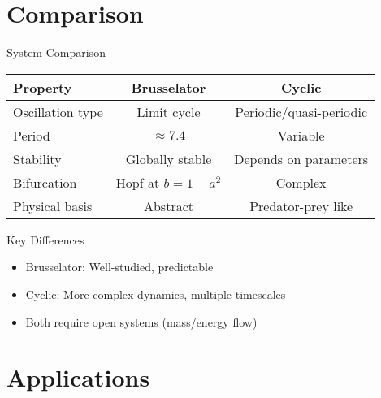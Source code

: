 \documentclass{beamer}
\begin{document}
\section{Comparison}

\begin{frame}{System Comparison}
\begin{table}
\centering
\begin{tabular}{|l|c|c|}
\hline
\textbf{Property} & \textbf{Brusselator} & \textbf{Cyclic} \\
\hline
Oscillation type & Limit cycle & Periodic/quasi-periodic \\
Period & $\approx 7.4$ & Variable \\
Stability & Globally stable & Depends on parameters \\
Bifurcation & Hopf at $b = 1 + a^2$ & Complex \\
Physical basis & Abstract & Predator-prey like \\
\hline
\end{tabular}
\end{table}

\begin{block}{Key Differences}
\begin{itemize}
    \item Brusselator: Well-studied, predictable
    \item Cyclic: More complex dynamics, multiple timescales
    \item Both require open systems (mass/energy flow)
\end{itemize}
\end{block}
\end{frame}

\section{Applications}
\end{document}
